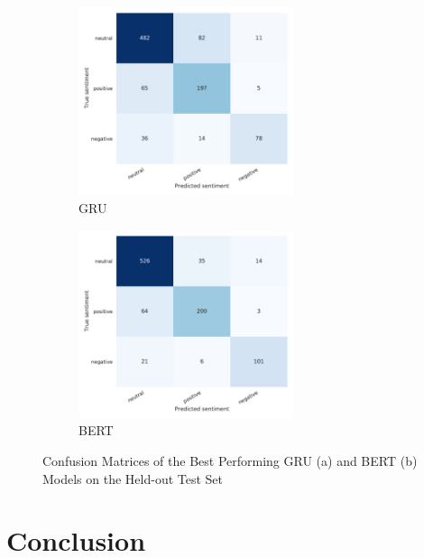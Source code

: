 \documentclass[final]{cvpr}
\begin{document}
\begin{figure}[h!]
	\begin{subfigure}[t]{\linewidth}
		\centering\captionsetup{width=\linewidth}
		\includegraphics[width=6.3cm]{fig/GRU_cm.pdf}
		\vspace{-0.1\baselineskip}
		\caption{\centering GRU}
	\end{subfigure}
	\par\medskip
	\begin{subfigure}[t]{\linewidth}
		\centering\captionsetup{width=\linewidth}
		\includegraphics[width=6.3cm]{fig/BERT_cm.pdf}
		\vspace{-0.1\baselineskip}
		\caption{\centering BERT}
	\end{subfigure}\hfill
	\caption{\centering Confusion Matrices of the Best Performing GRU (a) and BERT (b) Models on the Held-out Test Set}
	\label{fig:cms}
\end{figure}



\section{Conclusion}
\end{document}
